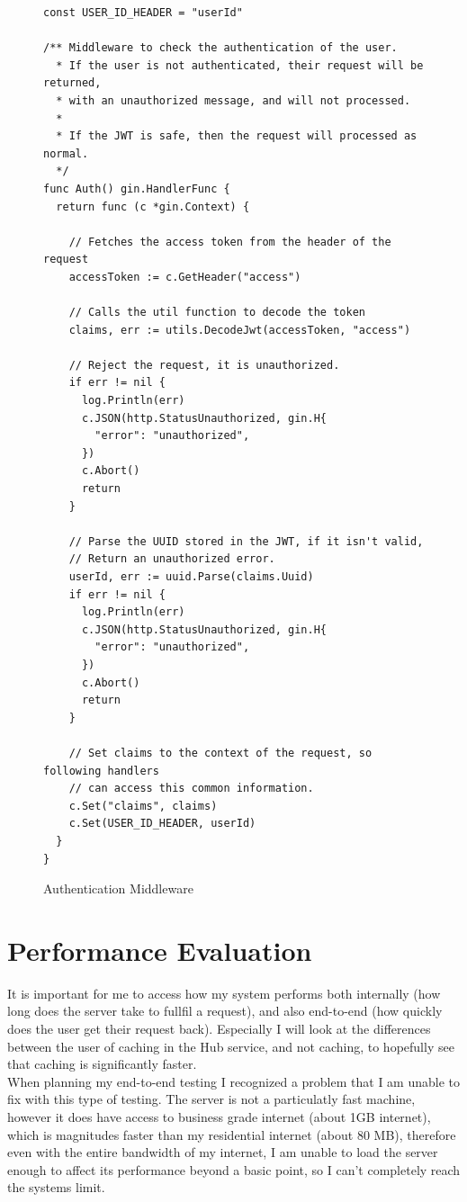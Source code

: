 \documentclass[titlepage]{article}
\begin{document}
\begin{figure}
  \caption{Authentication Middleware}
  \label{authmiddleware}
  \begin{verbatim}
const USER_ID_HEADER = "userId"

/** Middleware to check the authentication of the user.
  * If the user is not authenticated, their request will be returned,
  * with an unauthorized message, and will not processed.
  *
  * If the JWT is safe, then the request will processed as normal.
  */
func Auth() gin.HandlerFunc {
  return func (c *gin.Context) {

    // Fetches the access token from the header of the request
    accessToken := c.GetHeader("access")

    // Calls the util function to decode the token
    claims, err := utils.DecodeJwt(accessToken, "access")

    // Reject the request, it is unauthorized.
    if err != nil {
      log.Println(err)
      c.JSON(http.StatusUnauthorized, gin.H{
        "error": "unauthorized",
      })
      c.Abort()
      return
    }

    // Parse the UUID stored in the JWT, if it isn't valid,
    // Return an unauthorized error.
    userId, err := uuid.Parse(claims.Uuid)
    if err != nil {
      log.Println(err)
      c.JSON(http.StatusUnauthorized, gin.H{
        "error": "unauthorized",
      })
      c.Abort()
      return
    }

    // Set claims to the context of the request, so following handlers
    // can access this common information.
    c.Set("claims", claims)
    c.Set(USER_ID_HEADER, userId)
  }
}
  \end{verbatim}
\end{figure}

\pagebreak
\section{Performance Evaluation}
It is important for me to access how my system performs both internally (how long does the server take to fullfil a request), and also end-to-end (how quickly does the user get their request back). Especially I will look at the differences between the user of caching in the Hub service, and not caching, to hopefully see that caching is significantly faster. \\

When planning my end-to-end testing I recognized a problem that I am unable to fix with this type of testing. The server is not a particulatly fast machine, however it does have access to business grade internet (about 1GB internet), which is magnitudes faster than my residential internet (about 80 MB), therefore even with the entire bandwidth of my internet, I am unable to load the server enough to affect its performance beyond a basic point, so I can't completely reach the systems limit.
\end{document}
